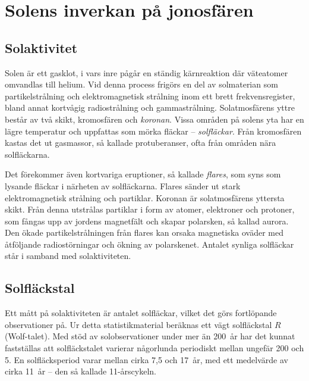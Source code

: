 \newpage %
\section[Solens inverkan]{Solens inverkan på jonosfären}
\label{solens_inverkan_jonosfaeren}

\subsection{Solaktivitet}

Solen är ett gasklot, i vars inre pågår en ständig kärnreaktion där
väteatomer omvandlas till helium.
Vid denna process frigörs en del av solmaterian som partikelstrålning och
elektromagnetisk strålning inom ett brett frekvensregister, bland annat
kortvågig radiostrålning och gammastrålning.
Solatmosfärens yttre består av två skikt, kromosfären och \emph{koronan}.
Vissa områden på solens yta har en lägre temperatur och uppfattas som mörka
fläckar -- \emph{solfläckar}.
Från kromosfären kastas det ut gasmassor, så kallade protuberanser, ofta från
områden nära solfläckarna.

Det förekommer även kortvariga eruptioner, så kallade \emph{flares}, som syns
som lysande fläckar i närheten av solfläckarna.
Flares sänder ut stark elektromagnetisk strålning och partiklar.
Koronan är solatmosfärens yttersta skikt.
Från denna utstrålas partiklar i form av atomer, elektroner och protoner, som
fångas upp av jordens magnetfält och skapar polarsken, så kallad aurora.
Den ökade partikelstrålningen från flares kan orsaka magnetiska oväder med
åtföljande radiostörningar och ökning av polarskenet.
Antalet synliga solfläckar står i samband med solaktiviteten.

\subsection{Solfläckstal}

Ett mått på solaktiviteten är antalet solfläckar, vilket det görs
fortlöpande observationer på.
Ur detta statistikmaterial beräknas ett vägt solfläckstal \(R\) (Wolf-talet).
Med stöd av solobservationer under mer än 200~år har det kunnat fastställas att
solfläckstalet varierar någorlunda periodiskt mellan ungefär 200 och 5.
En solfläcksperiod varar mellan cirka 7,5 och 17~år, med ett medelvärde
av cirka 11~år -- den så kallade 11-årscykeln.

